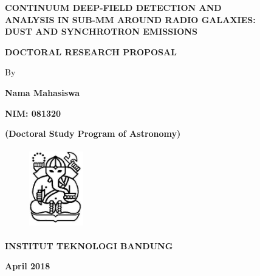 \pagestyle{empty}
\begin{titlepage}
\begin{center}
\mbox{}
\vspace{1cm}

\textbf{CONTINUUM DEEP-FIELD DETECTION AND \\ ANALYSIS IN SUB-MM AROUND RADIO GALAXIES: \\ DUST AND SYNCHROTRON EMISSIONS}

\vspace{3cm}

\textbf{DOCTORAL RESEARCH PROPOSAL}\\

\vspace{3cm}

\normalsize{By}

\textbf{Nama Mahasiswa}

\textbf{NIM: 081320}

\textbf{(Doctoral Study Program of Astronomy)}

\vspace{2.0cm}

\begin{figure}[!h]
\centering
\includegraphics[width=2.35cm, height=3.5cm]{fig/logo_itb.png}
\end{figure}

\vspace{2.0cm}

\textbf{INSTITUT TEKNOLOGI BANDUNG}

\textbf{April 2018}

\end{center}
\end{titlepage}

\cleardoublepage

